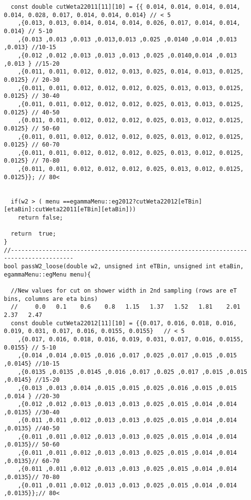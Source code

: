 \begin{lstlisting}
  const double cutWeta22011[11][10] = {{ 0.014, 0.014, 0.014, 0.014, 0.014, 0.028, 0.017, 0.014, 0.014, 0.014} // < 5 
	,{0.013, 0.013, 0.014, 0.014, 0.014, 0.026, 0.017, 0.014, 0.014, 0.014} // 5-10
	,{0.013 ,0.013 ,0.013 ,0.013,0.013 ,0.025 ,0.0140 ,0.014 ,0.013 ,0.013} //10-15
	,{0.012 ,0.012 ,0.013 ,0.013 ,0.013 ,0.025 ,0.0140,0.014 ,0.013 ,0.013 } //15-20
	,{0.011, 0.011, 0.012, 0.012, 0.013, 0.025, 0.014, 0.013, 0.0125, 0.0125} // 20-30
	,{0.011, 0.011, 0.012, 0.012, 0.012, 0.025, 0.013, 0.013, 0.0125, 0.0125} // 30-40
	,{0.011, 0.011, 0.012, 0.012, 0.012, 0.025, 0.013, 0.013, 0.0125, 0.0125} // 40-50
	,{0.011, 0.011, 0.012, 0.012, 0.012, 0.025, 0.013, 0.012, 0.0125, 0.0125} // 50-60
	,{0.011, 0.011, 0.012, 0.012, 0.012, 0.025, 0.013, 0.012, 0.0125, 0.0125} // 60-70
	,{0.011, 0.011, 0.012, 0.012, 0.012, 0.025, 0.013, 0.012, 0.0125, 0.0125} // 70-80
	,{0.011, 0.011, 0.012, 0.012, 0.012, 0.025, 0.013, 0.012, 0.0125, 0.0125}}; // 80<  


  if(w2 > ( menu ==egammaMenu::eg2012?cutWeta22012[eTBin][etaBin]:cutWeta22011[eTBin][etaBin]))
    return false;
       
  return  true;
}
//----------------------------------------------------------------------------------------
bool passW2_loose(double w2, unsigned int eTBin, unsigned int etaBin, egammaMenu::egMenu menu){
  
  //New values for cut on shower width in 2nd sampling (rows are eT bins, columns are eta bins)
  //     0.0   0.1    0.6    0.8   1.15   1.37   1.52   1.81    2.01   2.37   2.47
  const double cutWeta22012[11][10] = {{0.017, 0.016, 0.018, 0.016, 0.019, 0.031, 0.017, 0.016, 0.0155, 0.0155}   // < 5 
	,{0.017, 0.016, 0.018, 0.016, 0.019, 0.031, 0.017, 0.016, 0.0155, 0.0155} // 5-10
	,{0.014 ,0.014 ,0.015 ,0.016 ,0.017 ,0.025 ,0.017 ,0.015 ,0.015 ,0.0145} //10-15
	,{0.0135 ,0.0135 ,0.0145 ,0.016 ,0.017 ,0.025 ,0.017 ,0.015 ,0.015 ,0.0145} //15-20
	,{0.013 ,0.013 ,0.014 ,0.015 ,0.015 ,0.025 ,0.016 ,0.015 ,0.015 ,0.014 } //20-30
	,{0.012 ,0.012 ,0.013 ,0.013 ,0.013 ,0.025 ,0.015 ,0.014 ,0.014 ,0.0135} //30-40
	,{0.011 ,0.011 ,0.012 ,0.013 ,0.013 ,0.025 ,0.015 ,0.014 ,0.014 ,0.0135} //40-50
	,{0.011 ,0.011 ,0.012 ,0.013 ,0.013 ,0.025 ,0.015 ,0.014 ,0.014 ,0.0135}// 50-60
	,{0.011 ,0.011 ,0.012 ,0.013 ,0.013 ,0.025 ,0.015 ,0.014 ,0.014 ,0.0135}// 60-70 
	,{0.011 ,0.011 ,0.012 ,0.013 ,0.013 ,0.025 ,0.015 ,0.014 ,0.014 ,0.0135}// 70-80 
	,{0.011 ,0.011 ,0.012 ,0.013 ,0.013 ,0.025 ,0.015 ,0.014 ,0.014 ,0.0135}};// 80<   


\end{lstlisting}
